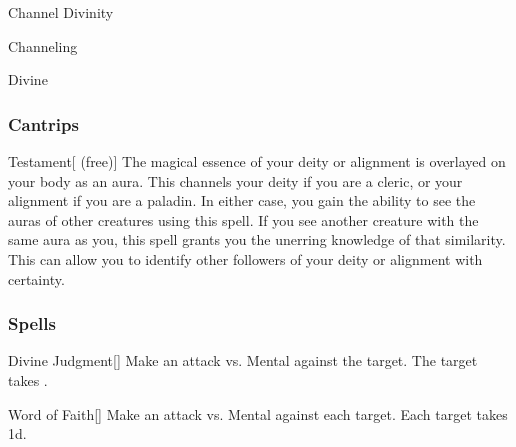 \newpage
\begin{spellsection}{Channel Divinity}

\begin{spellheader}
\end{spellheader}


 Channeling

 Divine

\subsubsection{Cantrips}


\begin{freeability}{Testament}[ (free)]
The magical essence of your deity or alignment is overlayed on your body as an aura.
This channels your deity if you are a cleric, or your alignment if you are a paladin.
In either case, you gain the ability to see the auras of other creatures using this spell.
If you see another creature with the same aura as you, this spell grants you the unerring knowledge of that similarity.
This can allow you to identify other followers of your deity or alignment with certainty.
\end{freeability}

\end{spellsection}


\subsubsection{Spells}


\lowercase{\hypertarget{spell:Divine Judgment}{}}\label{spell:Divine Judgment}
\begin{freeability}[\nth{1}]{\hypertarget{spell:Divine Judgment}{Divine Judgment}}[]
Make an attack vs. Mental against the target.
\hit The target takes .
\end{freeability}
\vspace{0.25em}



\lowercase{\hypertarget{spell:Word of Faith}{}}\label{spell:Word of Faith}
\begin{freeability}[\nth{2}]{\hypertarget{spell:Word of Faith}{Word of Faith}}[]
Make an attack vs. Mental against each target.
\hit Each target takes  \minus1d.
\end{freeability}
\vspace{0.25em}



